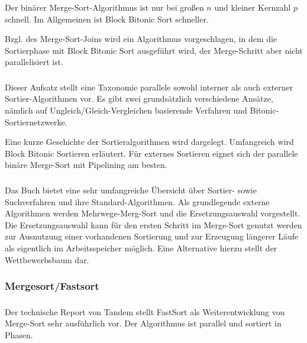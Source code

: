 \documentclass[a4paper,12pt,twoside]{article}
\begin{document}
Der binärer Merge-Sort-Algorithmus ist nur bei großen $n$ und kleiner Kernzahl $p$ schnell. Im Allgemeinen ist Block Bitonic Sort schneller.

Bzgl. des Merge-Sort-Joins wird ein Algorithmus vorgeschlagen, in dem die Sortierphase mit Block Bitonic Sort ausgeführt wird, der Merge-Schritt aber nicht parallelisiert ist. 

\subsubsection*{}

Dieser Aufsatz stellt eine Taxonomie parallele sowohl interner als auch externer Sortier-Algorithmen vor. Es gibt zwei grundsätzlich verschiedene Ansätze, nämlich auf Ungleich/Gleich-Vergleichen basierende Verfahren und Bitonic-Sortiernetzwerke.

Eine kurze Geschichte der Sortieralgorithmen wird dargelegt. Umfangreich wird Block Bitonic Sortieren erläutert. Für externes Sortieren eignet sich der parallele binäre Merge-Sort mit Pipelining am besten. 

\subsubsection*{}

Das Buch bietet eine sehr umfangreiche Übersicht über Sortier- sowie Suchverfahren und ihre Standard-Algorithmen. Als grundlegende externe Algorithmen werden Mehrwege-Merg-Sort und die Ersetzungsauswahl vorgestellt. Die Ersetzungsauswahl kann für den ersten Schritt im Merge-Sort genutzt werden zur Ausnutzung einer vorhandenen Sortierung und zur Erzeugung längerer Läufe als eigentlich im Arbeitsspeicher möglich. Eine Alternative hierzu stellt der Wettbewerbsbaum dar. 

\subsubsection{Mergesort/Fastsort}

\subsubsection*{}

Der technische Report von Tandem stellt FastSort als Weiterentwicklung von Merge-Sort sehr ausführlich vor. Der Algorithmus ist parallel und sortiert in Phasen.
\end{document}
